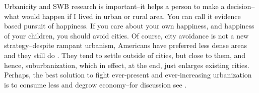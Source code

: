 \documentclass[10pt, letterpaper]{article}
\newcommand{\emd}[1]{\ExecuteMetaData[/tmp/tex]{#1}} %
\begin{document}
\begin{spacing}{2.0}
Urbanicity and SWB research is important--it helps a person to make a decision--what would happen if I
 lived in urban or rural area. You can call it evidence based pursuit of happiness. %
 If you care about your own
happiness, and happiness of your children, you should avoid cities. Of course,
city avoidance is not a new strategy--despite rampant urbanism, Americans
 have preferred less dense areas \citep{fuguitt90,fuguitt75}
 and they still do \citep{YouGov12-place}.
  They tend to settle outside of cities, but close to them, and hence,
 suburbanization, which in effect, at the end, just enlarges existing
 cities. Perhaps, the best solution to fight ever-present and ever-increasing
 urbanization is to consume less and degrow economy--for discussion see
 \citep{aokCityBook15,kallis12}.











\end{spacing}
\end{document}
